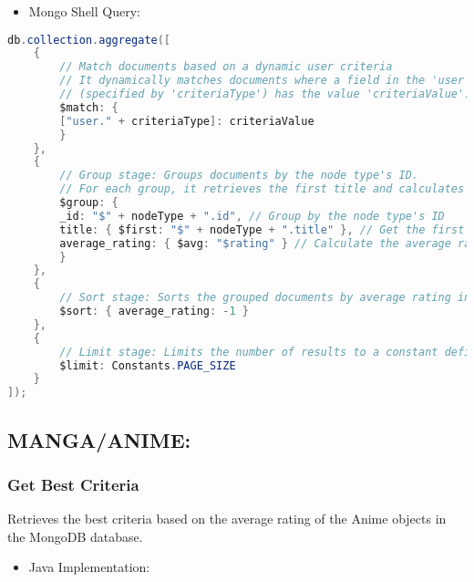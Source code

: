 \begin{itemize}
    \item Mongo Shell Query:
\end{itemize}

\begin{mdframed}[style=customstyle]
\begin{lstlisting}[language=java]
db.collection.aggregate([
    {
        // Match documents based on a dynamic user criteria
        // It dynamically matches documents where a field in the 'user' object 
        // (specified by 'criteriaType') has the value 'criteriaValue'.
        $match: {
        ["user." + criteriaType]: criteriaValue
        }
    },
    {
        // Group stage: Groups documents by the node type's ID.
        // For each group, it retrieves the first title and calculates the average rating.
        $group: {
        _id: "$" + nodeType + ".id", // Group by the node type's ID
        title: { $first: "$" + nodeType + ".title" }, // Get the first title in the group
        average_rating: { $avg: "$rating" } // Calculate the average rating for the group
        }
    },
    {
        // Sort stage: Sorts the grouped documents by average rating in descending order.
        $sort: { average_rating: -1 }
    },
    {
        // Limit stage: Limits the number of results to a constant defined by 'Constants.PAGE_SIZE'.
        $limit: Constants.PAGE_SIZE
    }
]);\end{lstlisting}
\end{mdframed}

\subsection*{MANGA/ANIME:}
\subsubsection*{Get Best Criteria}

Retrieves the best criteria based on the average rating of the Anime objects in the MongoDB database.
\begin{itemize}
    \item Java Implementation:
\end{itemize}

